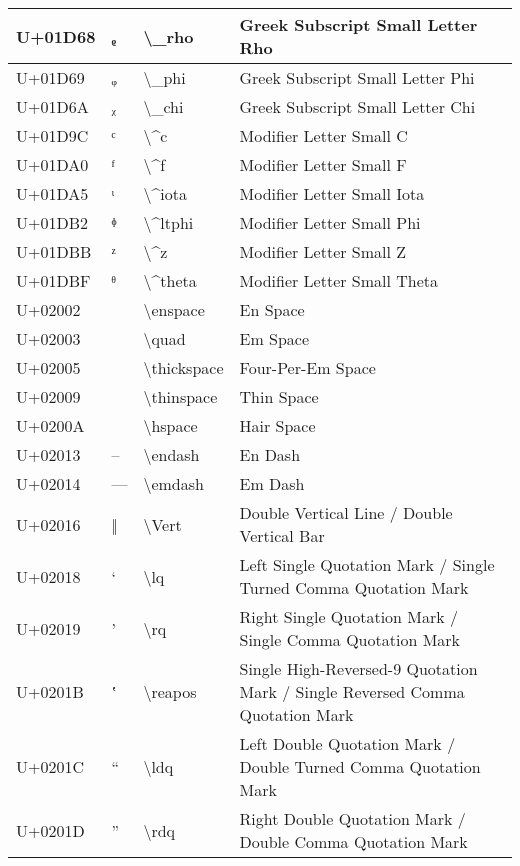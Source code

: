 \begin{table}[h]
\begin{tabulary}{\linewidth}{|L|L|L|L|}
\hline
U+01D68 & ᵨ & {\textbackslash}\_rho & Greek Subscript Small Letter Rho \\
\hline
U+01D69 & ᵩ & {\textbackslash}\_phi & Greek Subscript Small Letter Phi \\
\hline
U+01D6A & ᵪ & {\textbackslash}\_chi & Greek Subscript Small Letter Chi \\
\hline
U+01D9C & ᶜ & {\textbackslash}{\textasciicircum}c & Modifier Letter Small C \\
\hline
U+01DA0 & ᶠ & {\textbackslash}{\textasciicircum}f & Modifier Letter Small F \\
\hline
U+01DA5 & ᶥ & {\textbackslash}{\textasciicircum}iota & Modifier Letter Small Iota \\
\hline
U+01DB2 & ᶲ & {\textbackslash}{\textasciicircum}ltphi & Modifier Letter Small Phi \\
\hline
U+01DBB & ᶻ & {\textbackslash}{\textasciicircum}z & Modifier Letter Small Z \\
\hline
U+01DBF & ᶿ & {\textbackslash}{\textasciicircum}theta & Modifier Letter Small Theta \\
\hline
U+02002 &   & {\textbackslash}enspace & En Space \\
\hline
U+02003 &   & {\textbackslash}quad & Em Space \\
\hline
U+02005 &   & {\textbackslash}thickspace & Four-Per-Em Space \\
\hline
U+02009 &   & {\textbackslash}thinspace & Thin Space \\
\hline
U+0200A &   & {\textbackslash}hspace & Hair Space \\
\hline
U+02013 & – & {\textbackslash}endash & En Dash \\
\hline
U+02014 & — & {\textbackslash}emdash & Em Dash \\
\hline
U+02016 & ‖ & {\textbackslash}Vert & Double Vertical Line / Double Vertical Bar \\
\hline
U+02018 & ‘ & {\textbackslash}lq & Left Single Quotation Mark / Single Turned Comma Quotation Mark \\
\hline
U+02019 & ’ & {\textbackslash}rq & Right Single Quotation Mark / Single Comma Quotation Mark \\
\hline
U+0201B & ‛ & {\textbackslash}reapos & Single High-Reversed-9 Quotation Mark / Single Reversed Comma Quotation Mark \\
\hline
U+0201C & “ & {\textbackslash}ldq & Left Double Quotation Mark / Double Turned Comma Quotation Mark \\
\hline
U+0201D & ” & {\textbackslash}rdq & Right Double Quotation Mark / Double Comma Quotation Mark \\

\end{tabulary}
\end{table}
